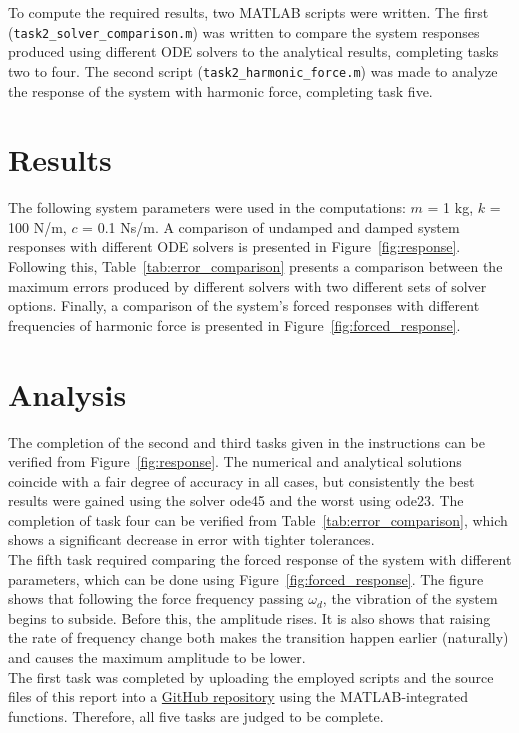 \documentclass{article}
\begin{document}
	To compute the required results, two MATLAB scripts were written. The first (\texttt{task2\_solver\_comparison.m}) was written to compare the system responses produced using different ODE solvers to the analytical results, completing tasks two to four. The second script (\texttt{task2\_harmonic\_force.m}) was made to analyze the response of the system with harmonic force, completing task five.
	
	\section*{Results}
	The following system parameters were used in the computations: $m$ = 1 kg, $k$ = 100 N/m, $c$ = 0.1 Ns/m. A comparison of undamped and damped system responses with different ODE solvers is presented in Figure~\ref*{fig:response}. Following this, Table~\ref*{tab:error_comparison} presents a comparison between the maximum errors produced by different solvers with two different sets of solver options. Finally, a comparison of the system's forced responses with different frequencies of harmonic force is presented in Figure~\ref*{fig:forced_response}.

	\section*{Analysis}
	The completion of the second and third tasks given in the instructions can be verified from Figure~\ref*{fig:response}. The numerical and analytical solutions coincide with a fair degree of accuracy in all cases, but consistently the best results were gained using the solver ode45 and the worst using ode23. The completion of task four can be verified from Table~\ref*{tab:error_comparison}, which shows a significant decrease in error with tighter tolerances.\\
	
	The fifth task required comparing the forced response of the system with different parameters, which can be done using Figure~\ref*{fig:forced_response}. The figure shows that following the force frequency passing $\omega_d$, the vibration of the system begins to subside. Before this, the amplitude rises. It is also shows that raising the rate of frequency change both makes the transition happen earlier (naturally) and causes the maximum amplitude to be lower. \\
	
	The first task was completed by uploading the employed scripts and the source files of this report into a \href{https://github.com/VesaVilleHurskainen/cmim2018}{GitHub repository} using the MATLAB-integrated functions. Therefore, all five tasks are judged to be complete.
	
\end{document}
